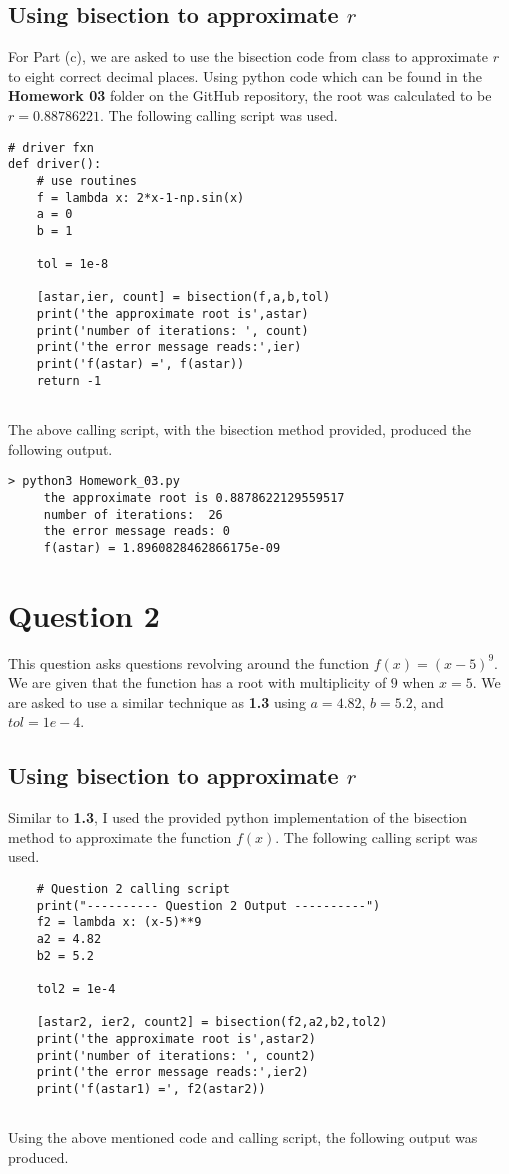 \documentclass{article}
\theoremstyle{theorem}
\begin{document}
\newpage
\subsection{Using bisection to approximate \(r\)}
For Part (c), we are asked to use the bisection code from class to approximate \(r\) to eight correct decimal places. Using python code which can be found in the \textbf{Homework 03} folder on the GitHub repository, the root was calculated to be \(r = 0.88786221\). The following calling script was used.
\begin{lstlisting}
# driver fxn
def driver():
    # use routines    
    f = lambda x: 2*x-1-np.sin(x)
    a = 0
    b = 1

    tol = 1e-8

    [astar,ier, count] = bisection(f,a,b,tol)
    print('the approximate root is',astar)
    print('number of iterations: ', count)
    print('the error message reads:',ier)
    print('f(astar) =', f(astar))
    return -1
    
\end{lstlisting}
The above calling script, with the bisection method provided, produced the following output.
\begin{lstlisting}
> python3 Homework_03.py
     the approximate root is 0.8878622129559517
     number of iterations:  26
     the error message reads: 0
     f(astar) = 1.8960828462866175e-09
\end{lstlisting}

\section{Question 2}
This question asks questions revolving around the function \(f(x) = (x-5)^9\). We are given that the function has a root with multiplicity of \(9\) when \(x=5\). We are asked to use a similar technique as \textbf{1.3} using \(a=4.82\), \(b=5.2\), and \(tol=1e-4\).

\subsection{Using bisection to approximate \(r\)}
Similar to \textbf{1.3}, I used the provided python implementation of the bisection method to approximate the function \(f(x)\). The following calling script was used.
\begin{lstlisting}
    # Question 2 calling script
    print("---------- Question 2 Output ----------")
    f2 = lambda x: (x-5)**9
    a2 = 4.82
    b2 = 5.2

    tol2 = 1e-4

    [astar2, ier2, count2] = bisection(f2,a2,b2,tol2)
    print('the approximate root is',astar2)
    print('number of iterations: ', count2)
    print('the error message reads:',ier2)
    print('f(astar1) =', f2(astar2))
    
\end{lstlisting}
Using the above mentioned code and calling script, the following output was produced.
\end{document}
